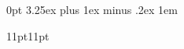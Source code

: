 \titlespacing*{\paragraph}
  {0pt}                               %
  {3.25ex plus 1ex minus .2ex}        %
  {1em}                               %

  {11pt}{11pt}%
  {\itshape}{}%
  {\bfseries}{}%
  {\newline}{}%
\theoremstyle{break}

\newtheorem{definition}{Définition}[chapter]

\newtheorem{theoreme}{Théorème}[chapter]

\newtheorem{remarque}{Remarque}[chapter]

\newtheorem{propriete}{Propriété}[chapter]
\newtheorem{exemple}{Exemple}[chapter]


\usepackage{makecell}

\renewcommand\theadalign{bl}
\renewcommand\theadfont{\bfseries}
\renewcommand\cellalign{bl}
\renewcommand\cellgape{\Gape[2pt]}

